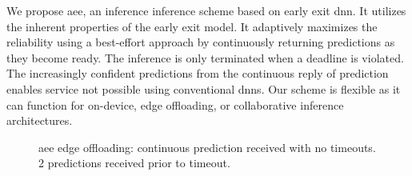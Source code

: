 We propose \acrfull{aee}, an inference inference scheme based on early exit \gls{dnn}. It utilizes the inherent properties of the early exit model. It adaptively maximizes the reliability using a best-effort approach by continuously returning predictions as they become ready. The inference is only terminated when a deadline is violated. The increasingly confident predictions from the continuous reply of prediction enables service not possible using conventional \gls{dnn}s. Our scheme is flexible as it can function for on-device, edge offloading, or collaborative inference architectures. 
\begin{figure}
	\captionsetup[subfigure]{justification=centering}
	\centering
\end{figure}
\begin{figure}
	\captionsetup[subfigure]{justification=centering}
	\centering
	\caption[Offloading scheme]{\gls{aee} edge offloading: \protect{} continuous prediction received with no timeouts. \protect{} 2 predictions received prior to timeout. }
	\label{fig:offloading-scheme}
\end{figure} 

